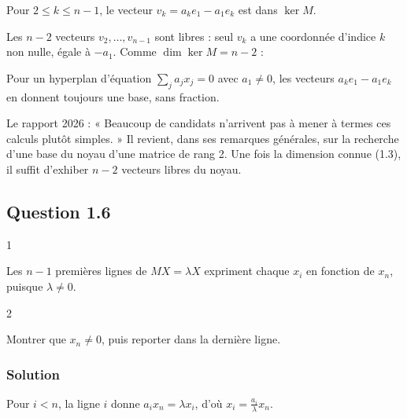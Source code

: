 \documentclass[11pt,a4paper]{article}
\newcommand{\equationajustee}[1]{%
  \sbox{\boiteequation}{$\displaystyle #1$}%
  \ifdim\wd\boiteequation>\linewidth
    \[\resizebox{\linewidth}{!}{\usebox{\boiteequation}}\]%
  \else
    \[#1\]%
  \fi}
\begin{document}
Pour \(2\le k\le n-1\), le vecteur \(v_k=a_ke_1-a_1e_k\) est dans \(\ker M\).

Les \(n-2\) vecteurs \(v_2,\dots,v_{n-1}\) sont libres : seul \(v_k\) a une coordonnée d'indice \(k\) non nulle, égale à \(-a_1\). Comme \(\dim\ker M=n-2\) :
\equationajustee{\ker M=\mathrm{Vect}(v_2,\dots,v_{n-1}).}

\begin{methode}

Pour un hyperplan d'équation \(\sum_ja_jx_j=0\) avec \(a_1\ne0\), les vecteurs \(a_ke_1-a_1e_k\) en donnent toujours une base, sans fraction.

\end{methode}

\begin{jury}

Le rapport 2026 : « Beaucoup de candidats n'arrivent pas à mener à termes ces calculs plutôt simples. » Il revient, dans ses remarques générales, sur la recherche d'une base du noyau d'une matrice de rang 2. Une fois la dimension connue (1.3), il suffit d'exhiber \(n-2\) vecteurs libres du noyau.

\end{jury}

\hypertarget{question-1.6}{%
\subsection{Question 1.6}\label{question-1.6}}

\begin{indication}{1}

Les \(n-1\) premières lignes de \(MX=\lambda X\) expriment chaque \(x_i\) en fonction de \(x_n\), puisque \(\lambda\ne0\).

\end{indication}

\begin{indication}{2}

Montrer que \(x_n\ne0\), puis reporter dans la dernière ligne.

\end{indication}

\hypertarget{solution-35}{%
\subsubsection{Solution}\label{solution-35}}

Pour \(i<n\), la ligne \(i\) donne \(a_ix_n=\lambda x_i\), d'où \(x_i=\frac{a_i}\lambda x_n\).
\end{document}
